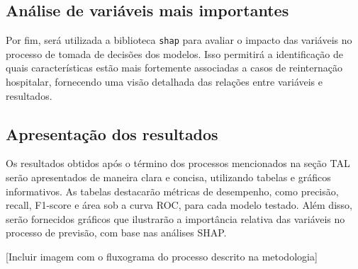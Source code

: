 \subsection{Análise de variáveis mais importantes}
Por fim, será utilizada a biblioteca \texttt{shap} para avaliar o impacto das variáveis no processo de tomada de decisões dos modelos. Isso permitirá a identificação de quais características estão mais fortemente associadas a casos de reinternação hospitalar, fornecendo uma visão detalhada das relações entre variáveis e resultados.

\subsection{Apresentação dos resultados}
Os resultados obtidos após o término dos processos mencionados na seção TAL serão apresentados de maneira clara e concisa, utilizando tabelas e gráficos informativos. As tabelas destacarão métricas de desempenho, como precisão, recall, F1-score e área sob a curva ROC, para cada modelo testado. Além disso, serão fornecidos gráficos que ilustrarão a importância relativa das variáveis no processo de previsão, com base nas análises SHAP.

[Incluir imagem com o fluxograma do processo descrito na metodologia]







